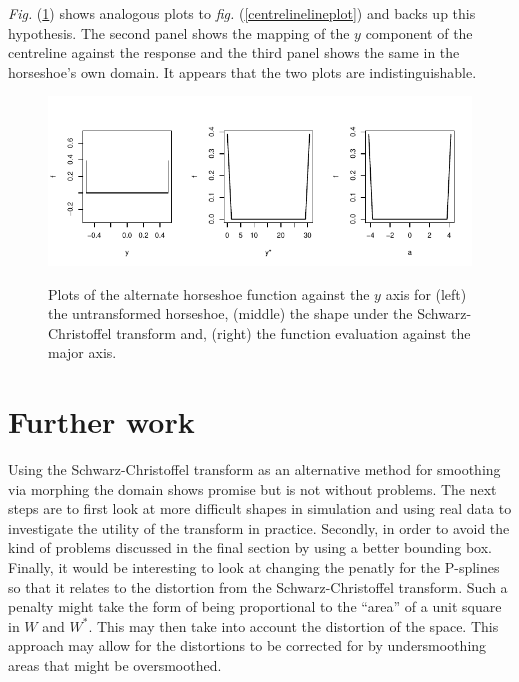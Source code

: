 \documentclass[a4paper,10pt]{amsart}
\newcommand{\sch}{Schwarz-Christoffel }
\newcommand{\fig}[1]{\emph{fig.} (\ref{#1})}
\newcommand{\Fig}[1]{\emph{Fig.} (\ref{#1})}
\begin{document}
\Fig{altcentrelinelineplot} shows analogous plots to \fig{centrelinelineplot} and backs up this hypothesis. The second panel shows the mapping of the $y$ component of the centreline against the response and the third panel shows the same in the horseshoe's own domain. It appears that the two plots are indistinguishable.


\begin{figure}
\centering
\includegraphics[trim=0in 0in 0in 0in]{figs/altcentrelinelineplots.pdf} \\
\caption{Plots of the alternate horseshoe function against the $y$ axis for (left) the untransformed horseshoe, (middle) the shape under the \sch transform and, (right) the function evaluation against the major axis.}
\label{altcentrelinelineplot}
\end{figure}


\section{Further work}

Using the \sch transform as an alternative method for smoothing via morphing the domain shows promise but is not without problems. The next steps are to first look at more difficult shapes in simulation and using real data to investigate the utility of the transform in practice. Secondly, in order to avoid the kind of problems discussed in the final section by using a better bounding box. Finally, it would be interesting to look at changing the penatly for the P-splines so that it relates to the distortion from the \sch transform. Such a penalty might take the form of being proportional to the ``area'' of a unit square in $W$ and $W^*$. This may then take into account the distortion of the space. This approach may allow for the distortions to be corrected for by undersmoothing areas that might be oversmoothed.






\end{document}
